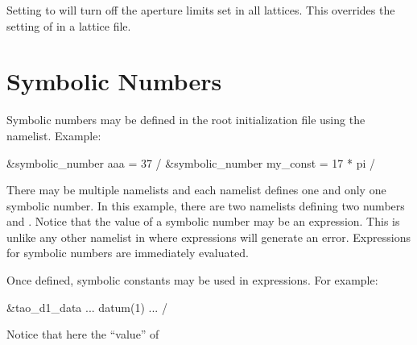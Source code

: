 {{{{{{{Setting  to  will turn off the aperture limits set in all
lattices. This overrides the setting of  in a lattice file.

\section{Symbolic Numbers}
\label{s:init.sym} 

Symbolic numbers may be defined in the root initialization file using the 
namelist. Example:
\begin{example}
  &symbolic_number aaa = 37 /
  &symbolic_number my_const = 17 * pi /
\end{example}
There may be multiple  namelists and each namelist defines one and only one
symbolic number. In this example, there are two namelists defining two numbers  and
. Notice that the value of a symbolic number may be an expression. This is unlike any
other namelist in \tao where expressions will generate an error. Expressions for symbolic numbers
are immediately evaluated.

Once defined, symbolic constants may be used in expressions. For example:
\begin{example}
  &tao_d1_data
    ...
    datum(1)%
    ...
  /
\end{example}
Notice that here the ``value'' of \vn{datum(1)%
the namelist is parsed.

Besides setting symbolic numbers in the main initialization file, symbolic numbers can be defined
using the \vn{set symbolic_number} command (\sref{s:set.symbolic}) and a list of symbolic numbers
can be printed using the \vn{show symbolic_number} command (\sref{s:show.symbolic}).

\section{Global Parameter Initialization}
\index{initialization!globals}
\label{s:globals} 

}}}}}}}}
